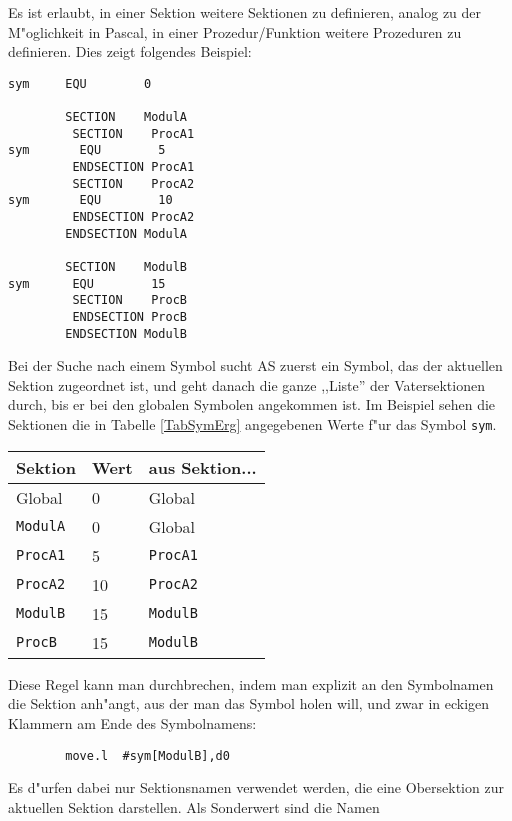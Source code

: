 \documentclass[12pt,a4paper,twoside]{report}
\newcommand{\tty}[1]{{\tt #1}}
\begin{document}
Es ist erlaubt, in einer Sektion weitere Sektionen zu definieren, analog
zu der M"oglichkeit in Pascal, in einer Prozedur/Funktion weitere
Prozeduren zu definieren.  Dies zeigt folgendes Beispiel:
\begin{verbatim}
sym     EQU        0

        SECTION    ModulA
         SECTION    ProcA1
sym       EQU        5
         ENDSECTION ProcA1
         SECTION    ProcA2
sym       EQU        10
         ENDSECTION ProcA2
        ENDSECTION ModulA

        SECTION    ModulB
sym      EQU        15
         SECTION    ProcB
         ENDSECTION ProcB
        ENDSECTION ModulB
\end{verbatim}
Bei der Suche nach einem Symbol sucht AS zuerst ein Symbol, das der aktuellen
Sektion zugeordnet ist, und geht danach die ganze ,,Liste'' der Vatersektionen
durch, bis er bei den globalen Symbolen angekommen ist.  Im Beispiel sehen
die Sektionen die in Tabelle \ref{TabSymErg} angegebenen Werte f"ur das Symbol
\tty{sym}.
\begin{table*}[htb]
\begin{center}\begin{tabular}{|l|l|l|}
\hline
Sektion      &    Wert   &   aus Sektion... \\
\hline
\hline
Global       &     0     &    Global        \\
\hline
\tty{ModulA} &     0     &    Global        \\
\hline
\tty{ProcA1} &     5     &    \tty{ProcA1}  \\
\hline
\tty{ProcA2} &    10     &    \tty{ProcA2}  \\
\hline
\tty{ModulB} &    15     &    \tty{ModulB}  \\
\hline
\tty{ProcB}  &    15     &    \tty{ModulB}  \\
\hline
\end{tabular}\end{center}
\caption{F"ur die einzelnen Sektionen g"ultigen Werte\label{TabSymErg}}
\end{table*}
Diese Regel kann man durchbrechen, indem man explizit an den Symbolnamen
die Sektion anh"angt, aus der man das Symbol holen will, und zwar in
eckigen Klammern am Ende des Symbolnamens:
\begin{verbatim}
        move.l  #sym[ModulB],d0
\end{verbatim}
Es d"urfen dabei nur Sektionsnamen verwendet werden, die eine Obersektion
zur aktuellen Sektion darstellen.  Als Sonderwert sind die Namen
\end{document}

